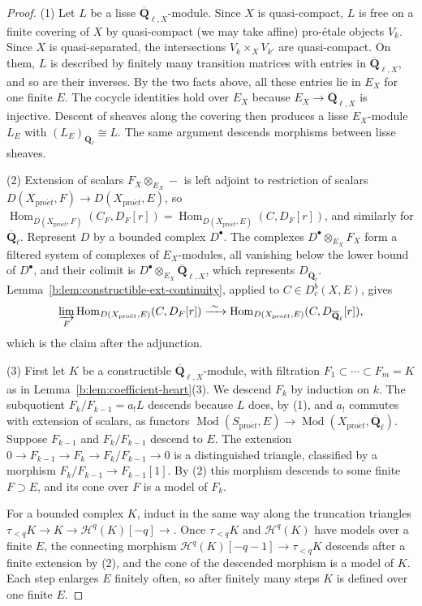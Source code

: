 \documentclass[11pt,a4paper]{article}
\numberwithin{equation}{section}
\theoremstyle{definition}
\theoremstyle{remark}
\newcommand{\D}{D}
\newcommand{\Dbc}{D^b_c}
\newcommand{\Mod}{\operatorname{Mod}}
\newcommand{\Qbar}{\overline{\mathbf Q}_\ell}
\newcommand{\proet}{\mathrm{pro}\acute{e}t}
\newcommand{\Hom}{\operatorname{Hom}}
\newcommand{\QbarX}{\overline{\mathbf Q}_{\ell,X}}
\begin{document}
\begin{proof}
(1) Let $L$ be a lisse $\QbarX$-module. Since $X$ is quasi-compact, $L$
is free on a finite covering of $X$ by quasi-compact (we may take affine)
pro-\'etale objects $V_k$. Since $X$ is quasi-separated, the
intersections $V_k\times_XV_{k'}$ are quasi-compact. On them, $L$ is
described by finitely many transition matrices with entries in
$\QbarX$, and so are their inverses. By the two facts above, all these entries lie in $E_X$ for
one finite $E$. The cocycle identities hold over $E_X$ because
$E_X\to\QbarX$ is injective. Descent of sheaves along the covering then
produces a lisse $E_X$-module $L_E$ with $(L_E)_{\Qbar}\cong L$. The same
argument descends morphisms between lisse sheaves.

(2) Extension of scalars $F_X\otimes_{E_X}-$ is left adjoint to
restriction of scalars $\D(X_{\proet},F)\to\D(X_{\proet},E)$, so
$\Hom_{\D(X_{\proet},F)}(C_F,D_F[r])=\Hom_{\D(X_{\proet},E)}(C,D_F[r])$,
and similarly for $\Qbar$. Represent $D$ by a bounded complex $D^\bullet$.
The complexes $D^\bullet\otimes_{E_X}F_X$ form a filtered system of
complexes of $E_X$-modules, all vanishing below the lower bound of
$D^\bullet$, and their colimit is $D^\bullet\otimes_{E_X}\QbarX$, which
represents $D_{\Qbar}$. Lemma~\ref{b:lem:constructible-ext-continuity},
applied to $C\in\Dbc(X,E)$, gives
\[
 \varinjlim_F\Hom_{\D(X_{\proet},E)}(C,D_F[r])
 \xrightarrow{\ \sim\ }\Hom_{\D(X_{\proet},E)}(C,D_{\Qbar}[r]),
\]
which is the claim after the adjunction.

(3) First let $K$ be a constructible $\QbarX$-module, with filtration
$F_1\subset\cdots\subset F_m=K$ as in
Lemma~\ref{b:lem:coefficient-heart}(3). We descend $F_k$ by induction on
$k$. The subquotient $F_k/F_{k-1}=a_!L$ descends because $L$ does, by
(1), and $a_!$ commutes with extension of scalars, as functors
$\Mod(S_{\proet},E)\to\Mod(X_{\proet},\Qbar)$. Suppose $F_{k-1}$ and
$F_k/F_{k-1}$ descend to $E$. The extension
$0\to F_{k-1}\to F_k\to F_k/F_{k-1}\to0$ is a distinguished triangle,
classified by a morphism $F_k/F_{k-1}\to F_{k-1}[1]$. By (2) this morphism
descends to some finite $F\supset E$, and its cone over $F$ is a model
of $F_k$.

For a bounded complex $K$, induct in the same way along the truncation
triangles $\tau_{<q}K\to K\to\mathcal H^q(K)[-q]\to$. Once
$\tau_{<q}K$ and $\mathcal H^q(K)$ have models over a finite $E$, the
connecting morphism $\mathcal H^q(K)[-q-1]\to\tau_{<q}K$ descends after a
finite extension by (2), and the cone of the descended morphism is a
model of $K$. Each step enlarges $E$ finitely often, so after finitely
many steps $K$ is defined over one finite $E$.
\end{proof}
\end{document}
